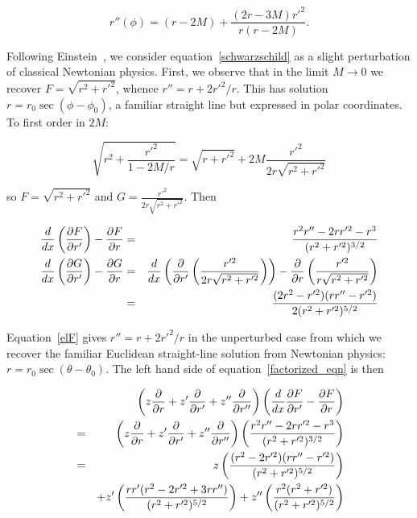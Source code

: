 \documentclass[pdflatex,sn-mathphys-num]{sn-jnl}%
\theoremstyle{thmstyleone}%
\theoremstyle{thmstyletwo}%
\theoremstyle{thmstylethree}%
\begin{document}
\begin{equation}\label{eulerstring}
  r''(\phi) = (r-2M) + \frac{(2r-3M)r'^2}{r(r-2M)}.
\end{equation}


Following Einstein~\cite{einstein1915}, we consider
equation~\ref{schwarzschild} as a slight perturbation of classical
Newtonian physics.  First, we observe that in the limit
$M\longrightarrow 0$ we recover $F=\sqrt{r^2+r'^2}$, whence $r'' = r +
2r'^2/r$.  This has solution $r=r_0\sec(\phi-\phi_0)$, a familiar
straight line but expressed in polar coordinates.  To first order in
$2M$:

\begin{equation}
\sqrt{r^2 + \frac{r'^2}{1-2M/r}}=\sqrt{r+r'^2} + 2M\frac{r'^2}{2r\sqrt{r^2 + r'^2}}
\end{equation}
  
so $F=\sqrt{r^2+r'^2}$ and $G=\frac{r'^2}{2r\sqrt{r^2+r'^2}}$.  Then

\begin{eqnarray}\label{elF}
\frac{d}{dx}\left(\frac{\partial{F}}{\partial{r'}}\right) -\frac{\partial{F}}{\partial{r}} &=& \frac{r^2r''- 2rr'^2 -r^3}{(r^2 +r'^2)^{3/2}}\\
\frac{d}{dx}\left(\frac{\partial{G}}{\partial{r'}}\right) -\frac{\partial{G}}{\partial{r}} &=&\label{elG}
\frac{d}{dx}\left(\frac{\partial}{\partial r'}\left(\frac{r'^2}{2r\sqrt{r^2+r'^2}}\right)\right)
- \frac{\partial}{\partial
  r}\left(\frac{r'^2}{r\sqrt{r^2+r'^2}}\right)\nonumber\\
&=& \frac{(2r^2-r'^2)(rr''-r'^2)}{2(r^2+r'^2)^{5/2}}
\end{eqnarray}

Equation~\ref{elF} gives $r'' = r + 2r'^2/r$ in the unperturbed case
from which we recover the familiar Euclidean straight-line solution
from Newtonian physics: $r=r_0\sec(\theta-\theta_0)$.  The left hand
side of equation~\ref{factorized_eqn} is then

\begin{eqnarray}
&{}& \left(z\frac{\partial{}}{\partial{r}} + z'\frac{\partial{}}{\partial{r'}} + z''\frac{\partial{}}{\partial{r''}}\right)
\left(\frac{d}{dx}\frac{\partial{F}}{\partial{r'}}
-\frac{\partial{F}}{\partial{r}}\right)\nonumber\\
&=&  \left(z\frac{\partial{}}{\partial{r}} + z'\frac{\partial{}}{\partial{r'}} + z''\frac{\partial{}}{\partial{r''}}\right)
\left(\frac{r^2r''- 2rr'^2 -r^3}{(r^2 +r'^2)^{3/2}}\right)\nonumber\\
&=& 
 z  \left(\frac{(r^2 - 2r'^2)(rr''-r'^2)}{(r^2 + r'^2)^{5/2}}\right)\nonumber\\
 &{}& + z' \left(\frac{rr'(r^2 - 2r'^2 + 3rr'')}{(r^2 + r'^2)^{5/2}}\right)
      + z''\left(\frac{r^2    (r^2+r'^2)       }{(r^2 + r'^2)^{5/2}}\right)
\end{eqnarray}
\end{document}
